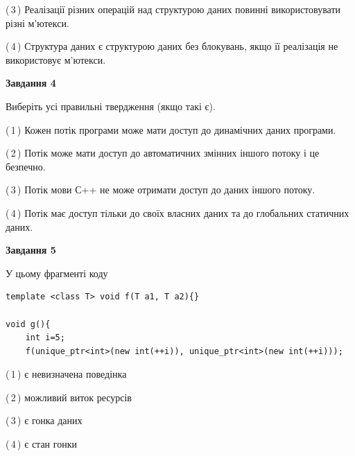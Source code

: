 \documentclass[12pt, ukrainian]{article}
\begin{document}
\begin {large}
{(\,3\,) Реалізації різних операцій над структурою даних повинні використовувати різні м’ютекси.%

(\,4\,) Структура даних є структурою даних без блокувань, якщо її реалізація не використовує м’ютекси.%



\begin{center}
\textbf{Завдання 4}
\end{center}
Виберіть усі правильні твердження (якщо такі є).\par
\vspace{2mm}

(\,1\,) Кожен потік програми може мати доступ до динамічних даних програми.%

(\,2\,) Потік може мати доступ до автоматичних змінних іншого потоку і це безпечно.%

(\,3\,) Потік мови С++ не може отримати доступ до даних іншого потоку.%

(\,4\,) Потік має доступ тільки до своїх власних даних та до глобальних статичних даних.%



\begin{center}
\textbf{Завдання 5}
\end{center}
У цьому фрагменті коду
\begin{verbatim}
template <class T> void f(T a1, T a2){}

void g(){
    int i=5;
    f(unique_ptr<int>(new int(++i)), unique_ptr<int>(new int(++i)));
\end{verbatim}

(\,1\,) є невизначена поведінка%

(\,2\,) можливий виток ресурсів%

(\,3\,) є гонка даних%

(\,4\,) є стан гонки%


}
\end {large}
\end{document}
